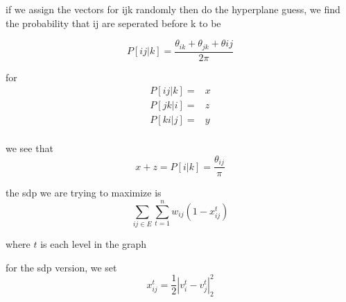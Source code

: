\documentclass{article}
\theoremstyle{definition}
\newcommand{\abs}[1]{\left| #1 \right|}
\begin{document}
if we assign the vectors for ijk randomly then do the hyperplane guess, we find the probability that ij are seperated before k to be

\begin{equation}
    P[ij\vert k] = \frac{\theta_{ik} + \theta_{jk} + \theta{ij}}{2\pi}
\end{equation}

for \begin{equation}
    \begin{split}
        P[ij\vert k]=&x\\
        P[jk\vert i]=&z\\
        P[ki\vert j]=&y\\
    \end{split}
\end{equation}

we see that
\begin{equation}
    x+z = P[i\vert k] = \frac{\theta_{ij}}{\pi}
\end{equation}

the sdp we are trying to maximize is 
\begin{equation}
    \sum_{ij\in E}^{}\sum_{t=1}^{n}w_{ij}\left( 1-x_{ij}^t \right)
\end{equation}

where \(t\) is each level in the graph

for the sdp version, we set 
\begin{equation}
    x_{ij}^t = \frac{1}{2}\abs{v_i^t-v_j^t}^2_2
\end{equation}
\end{document}
